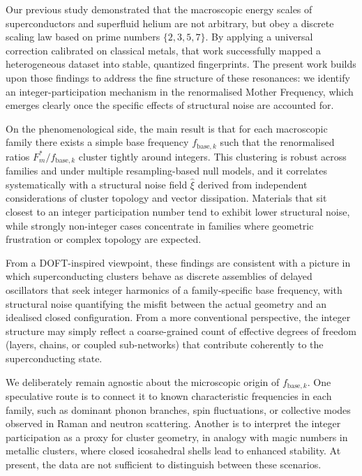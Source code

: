 \documentclass[aps,prb,twocolumn,superscriptaddress,floatfix,nofootinbib]{revtex4-2}
\begin{document}
Our previous study \cite{Agostino2025_Study01} demonstrated that the macroscopic 
energy scales of superconductors and superfluid helium are not arbitrary, 
but obey a discrete scaling law based on prime numbers $\{2, 3, 5, 7\}$. By applying 
a universal correction calibrated on classical metals, that work successfully mapped a 
heterogeneous dataset into stable, quantized fingerprints. The present work 
builds upon those findings to address the fine structure of these 
resonances: we identify an integer-participation mechanism in the renormalised 
Mother Frequency, which emerges clearly once the specific effects of 
structural noise are accounted for.

On the phenomenological side, the main result is that for each macroscopic
family there exists a simple base frequency \(f_{\mathrm{base},k}\) such that
the renormalised ratios \(F_m^*/f_{\mathrm{base},k}\) cluster tightly around
integers. This clustering is robust across families and under multiple
resampling-based null models, and it correlates systematically with a
structural noise field \(\hat\xi\) derived from independent considerations
of cluster topology and vector dissipation. Materials that sit closest to an integer
participation number tend to exhibit lower structural noise, while strongly
non-integer cases concentrate in families where geometric frustration or
complex topology are expected.

From a DOFT-inspired viewpoint, these findings are consistent with a picture
in which superconducting clusters behave as discrete assemblies of delayed
oscillators that seek integer harmonics of a family-specific base frequency,
with structural noise quantifying the misfit between the actual geometry and
an idealised closed configuration. From a more conventional perspective, the
integer structure may simply reflect a coarse-grained count of effective
degrees of freedom (layers, chains, or coupled sub-networks) that contribute
coherently to the superconducting state.

We deliberately remain agnostic about the microscopic origin of
\(f_{\mathrm{base},k}\). One speculative route is to connect it to known
characteristic frequencies in each family, such as dominant phonon branches,
spin fluctuations, or collective modes observed in Raman and neutron
scattering. Another is to interpret the integer participation as a proxy for
cluster geometry, in analogy with magic numbers in metallic clusters, where
closed icosahedral shells lead to enhanced stability. At present, the data
are not sufficient to distinguish between these scenarios.
\end{document}
